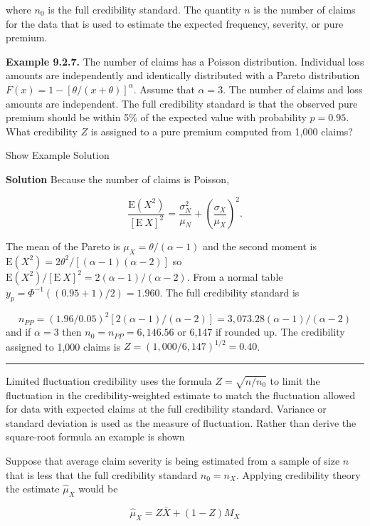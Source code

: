 \documentclass[]{book}
\theoremstyle{definition}
\theoremstyle{definition}
\theoremstyle{definition}
\theoremstyle{remark}
\begin{document}
where \(n_0\) is the full credibility standard. The quantity \(n\) is
the number of claims for the data that is used to estimate the expected
frequency, severity, or pure premium.

\textbf{Example 9.2.7.} The number of claims has a Poisson distribution.
Individual loss amounts are independently and identically distributed
with a Pareto distribution \(F(x)=1-[\theta/(x+\theta)]^{\alpha}\).
Assume that \(\alpha=3\). The number of claims and loss amounts are
independent. The full credibility standard is that the observed pure
premium should be within 5\(\%\) of the expected value with probability
\(p=0.95\). What credibility \(Z\) is assigned to a pure premium
computed from 1,000 claims?

Show Example Solution

\hypertarget{toggleExampleCred.2.7}{}
\textbf{Solution} Because the number of claims is Poisson,

\[
\frac{\mathrm{E}(X^2)}{[\mathrm{E}~X]^2}
=\frac{\sigma_N^2}{\mu_N}+\left(\frac{\sigma_X}{\mu_X}\right)^2.  
\]

The mean of the Pareto is \(\mu_X=\theta/(\alpha-1)\) and the second
moment is \(\mathrm{E}(X^2)=2\theta^{2}/[(\alpha-1)(\alpha-2)]\) so
\(\mathrm{E}(X^2)/[\mathrm{E}~X]^2=2(\alpha-1)/(\alpha-2)\). From a
normal table \(y_p=\Phi^{-1}((0.95+1)/2)=1.960\). The full credibility
standard is

\[n_{PP}=(1.96/0.05)^{2}[2(\alpha-1)/(\alpha-2)]=3,073.28(\alpha-1)/(\alpha-2)\]
and if \(\alpha=3\) then \(n_0=n_{PP}=6,146.56\) or 6,147 if rounded up.
The credibility assigned to 1,000 claims is
\(Z=(1,000/6,147)^{1/2}=0.40\).

\begin{center}\rule{0.5\linewidth}{\linethickness}\end{center}

Limited fluctuation credibility uses the formula \(Z=\sqrt{n/n_0}\) to
limit the fluctuation in the credibility-weighted estimate to match the
fluctuation allowed for data with expected claims at the full
credibility standard. Variance or standard deviation is used as the
measure of fluctuation. Rather than derive the square-root formula an
example is shown

Suppose that average claim severity is being estimated from a sample of
size \(n\) that is less that the full credibility standard \(n_0=n_X\).
Applying credibility theory the estimate \(\hat{\mu}_X\) would be

\begin{equation*}
\hat{\mu}_X=Z\bar{X}+(1-Z)M_X
\end{equation*}
\end{document}
